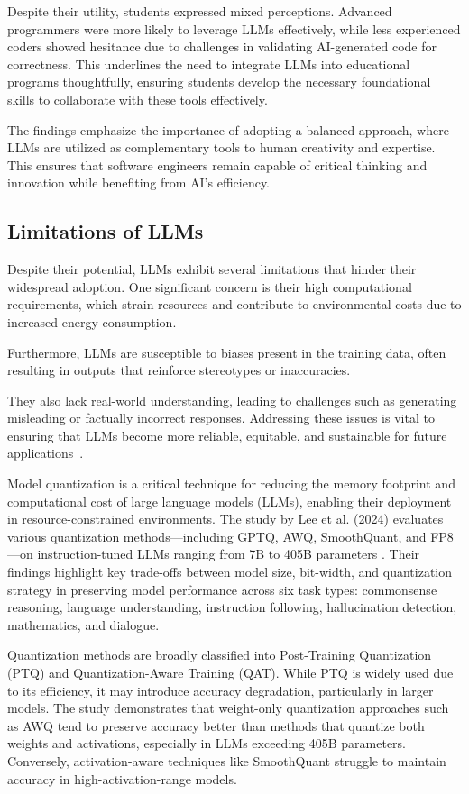 Despite their utility, students expressed mixed perceptions. Advanced programmers were more likely to leverage LLMs effectively, while less experienced coders showed hesitance due to challenges in validating AI-generated code for correctness. This underlines the need to integrate LLMs into educational programs thoughtfully, ensuring students develop the necessary foundational skills to collaborate with these tools effectively.

The findings emphasize the importance of adopting a balanced approach, where LLMs are utilized as complementary tools to human creativity and expertise. This ensures that software engineers remain capable of critical thinking and innovation while benefiting from AI's efficiency.
\subsection{Limitations of LLMs}

Despite their potential, LLMs exhibit several limitations that hinder their widespread adoption. One significant concern is their high computational requirements, which strain resources and contribute to environmental costs due to increased energy consumption. 

Furthermore, LLMs are susceptible to biases present in the training data, often resulting in outputs that reinforce stereotypes or inaccuracies. 

They also lack real-world understanding, leading to challenges such as generating misleading or factually incorrect responses. Addressing these issues is vital to ensuring that LLMs become more reliable, equitable, and sustainable for future applications~\cite{12}.

Model quantization is a critical technique for reducing the memory footprint and computational cost of large language models (LLMs), enabling their deployment in resource-constrained environments. The study by Lee et al. (2024) evaluates various quantization methods—including GPTQ, AWQ, SmoothQuant, and FP8—on instruction-tuned LLMs ranging from 7B to 405B parameters \cite{lee2024}. Their findings highlight key trade-offs between model size, bit-width, and quantization strategy in preserving model performance across six task types: commonsense reasoning, language understanding, instruction following, hallucination detection, mathematics, and dialogue.

Quantization methods are broadly classified into Post-Training Quantization (PTQ) and Quantization-Aware Training (QAT). While PTQ is widely used due to its efficiency, it may introduce accuracy degradation, particularly in larger models. The study demonstrates that weight-only quantization approaches such as AWQ tend to preserve accuracy better than methods that quantize both weights and activations, especially in LLMs exceeding 405B parameters. Conversely, activation-aware techniques like SmoothQuant struggle to maintain accuracy in high-activation-range models.

